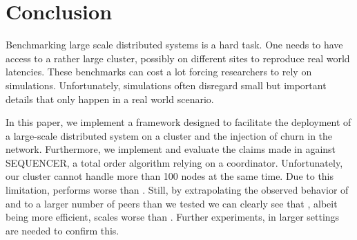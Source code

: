 \section{Conclusion}
\label{sec:conclusion}
Benchmarking large scale distributed systems is a hard task. One needs to have access to a rather large cluster, possibly on different sites to reproduce real world latencies. These benchmarks can cost a lot forcing researchers to rely on simulations. Unfortunately, simulations often disregard small but important details that only happen in a real world scenario.

In this paper, we implement \sys a framework designed to facilitate the deployment of a large-scale distributed system on a cluster and the injection of churn in the network. Furthermore, we implement \epto and evaluate the claims made in \autocite{matos2015epto} against \jgroups SEQUENCER, a total order algorithm relying on a coordinator. Unfortunately, our cluster cannot handle more than 100 nodes at the same time. Due to this limitation, \epto performs worse than \jgroups.
Still, by extrapolating the observed behavior of \epto and \jgroups to a larger number of peers than we tested we can clearly see that \jgroups, albeit being more efficient, scales worse than \epto.
Further experiments, in larger settings are needed to confirm this.
